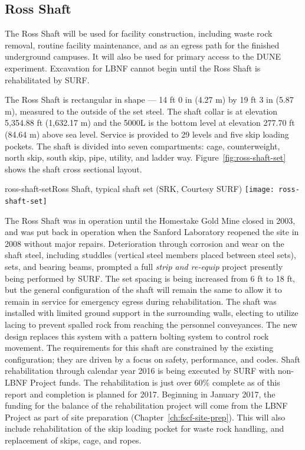 \subsection{Ross Shaft}
\label{sec:fscf-und-shafts-ross}

The Ross Shaft will be used for facility construction, including waste rock removal, routine facility maintenance, and as an egress path for the finished underground campuses. It will also be used for primary access to the DUNE experiment. Excavation for LBNF cannot begin until the Ross Shaft is rehabilitated by  SURF.

The Ross Shaft is rectangular in shape --- 14 ft 0 in (4.27 m) by 19 ft 3 in (5.87 m), measured to the outside of the set steel. The shaft collar is at elevation 5,354.88 ft (1,632.17 m) and the 5000L is the bottom level at elevation 277.70 ft (84.64 m) above sea level. 
 Service is provided to 29 levels and five skip loading pockets. The shaft is divided into seven compartments: cage, counterweight, north skip, south skip, pipe, utility, and ladder way. Figure~\ref{fig:ross-shaft-set} shows the shaft cross sectional layout. 


\begin{cdrfigure}{ross-shaft-set}{Ross Shaft, typical shaft set (SRK, Courtesy SURF)}
\texttt{[image: ross-shaft-set]}
\end{cdrfigure}

The Ross Shaft was in operation until the Homestake Gold Mine closed in 2003, and was put back in operation when the Sanford Laboratory reopened
 the site in 2008 without major repairs.  Deterioration through corrosion and wear on the shaft steel, including studdles (vertical steel members placed between steel sets), sets, and bearing beams, prompted a full \textit{strip and re-equip} project presently being performed by  SURF. 
The set spacing is being increased from 6 ft to 18 ft, but the general configuration of the shaft will remain the same to allow it to remain in service for emergency egress during rehabilitation. 
The shaft was installed with limited ground support in the surrounding walls, electing to utilize lacing to prevent spalled rock from reaching the personnel conveyances. 
The new design replaces this system with a pattern bolting system to control rock movement. 
The requirements for this shaft are constrained by the existing configuration; they are driven by a focus on safety, performance, and codes.
%
Shaft rehabilitation through calendar year 2016 is being executed by SURF with non-LBNF Project funds. The rehabilitation is just over 60\% complete as of this report and completion is planned for 2017. Beginning in January 2017, the funding for the balance of the rehabilitation project will come from the LBNF Project as part of site preparation (Chapter~\ref{ch:fscf-site-prep}).  This will also include rehabilitation of the skip loading pocket for waste rock handling, and replacement of skips, cage, and ropes.

